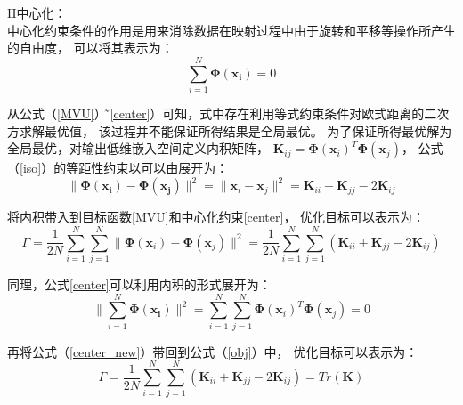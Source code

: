 \textrm{II}\quad 中心化：\\
中心化约束条件的作用是用来消除数据在映射过程中由于旋转和平移等操作所产生的自由度，
可以将其表示为：
\begin{equation}
\label{center}
\sum_{i=1}^{N}\bm{\Phi(\textbf{x}_i)}=0
\end{equation}

从公式（\ref{MVU}）\~（\ref{center}）可知，式中存在利用等式约束条件对欧式距离的二次方求解最优值，
该过程并不能保证所得结果是全局最优。
为了保证所得最优解为全局最优，对输出低维嵌入空间定义内积矩阵，
$\mathbf{K}_{ij}=\bm{\Phi}(\mathbf{x}_i)^T\bm{\Phi}(\mathbf{x}_j)$，
公式（\ref{iso}）的等距性约束以可以由展开为：
\begin{equation}
\|\bm{\Phi(\textbf{x}_i)}-\bm{\Phi(\textbf{x}_j)}\|^2=\|\textbf{x}_i-\textbf{x}_j\|^2
=\mathbf{K}_{ii}+\mathbf{K}_{jj}-2\mathbf{K}_{ij}
\end{equation}

将内积带入到目标函数\ref{MVU}和中心化约束\ref{center}，
优化目标可以表示为：
\begin{equation}
\label{obj}
\Gamma= \frac{1}{2N}\sum_{i=1}^{N}\sum_{j=1}^{N}\parallel\bm{\Phi}(\textbf{x}_i)-
\bm{\Phi}( \textbf{x}_j)\parallel^2
=\frac{1}{2N}\sum_{i=1}^{N}\sum_{j=1}^{N}(\mathbf{K}_{ii}+\mathbf{K}_{jj}-2\mathbf{K}_{ij})
\end{equation}

同理，公式\ref{center}可以利用内积的形式展开为：
\begin{equation}
\label{center_new}
\|\sum_{i=1}^{N}\bm{\Phi(\textbf{x}_i)}\|^2
=\sum_{i=1}^{N}\sum_{j=1}^{N}\bm{\Phi}(\textbf{x}_i)^T\bm{\Phi}(\textbf{x}_j)
=0
\end{equation}

再将公式（\ref{center_new}）带回到公式（\ref{obj}）中，
优化目标可以表示为：
\begin{equation}
\Gamma= \frac{1}{2N}\sum_{i=1}^{N}\sum_{j=1}^{N}(\mathbf{K}_{ii}+\mathbf{K}_{jj}-2\mathbf{K}_{ij})
      = Tr(\mathbf{K})
\end{equation}

